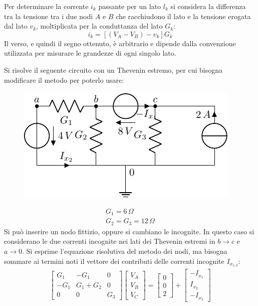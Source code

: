 \documentclass{article}
\numberwithin{equation}{subsection}
\begin{document}
Per determinare la corrente $i_k$ passante per un lato $l_k$ si considera la differenza tra la tensione tra i due nodi $A$ e $B$ che racchiudono il lato e la tensione erogata dal 
lato $v_k$, moltiplicata per la conduttanza del lato $G_k$:
\begin{equation*}
    i_k=[(V_A-V_B)-v_k]G_k
\end{equation*}
Il verso, e quindi il segno ottenuto, è arbitrario e dipende dalla convenzione utilizzata per misurare le grandezze di ogni singolo lato. 


Si risolve il seguente circuito con un Thevenin estremo, per cui bisogna modificare il metodo per poterlo usare:
\begin{figure}[H]%
    \centering
    \includegraphics{circuito-2.pdf}
    \label{fig:circuito-2}
\end{figure}
\begin{gather*}
    G_1=6\,\Omega\\
    G_2=G_3=12\,\Omega
\end{gather*}
Si può inserire un nodo fittizio, oppure si cambiano le incognite. In questo caso si considerano le due correnti incognite nei lati dei Thevenin estremi in $b\to c$ e $a\to0$. 
Si esprime l'equazione risolutiva del metodo dei nodi, ma bisogna sommare ai termini noti il vettore dei contributi delle correnti incognite $I_{x_{1,2}}$: 
\begin{gather*}
    \begin{bmatrix}
        G_1&-G_1&0\\-G_1&G_1+G_2&0\\0&0&G_3
    \end{bmatrix}\begin{bmatrix}
        V_A\\V_B\\V_C
    \end{bmatrix}=\begin{bmatrix}
        0\\0\\2
    \end{bmatrix}+\begin{bmatrix}
        -I_{x_1}\\I_{x_2}\\-I_{x_2}
    \end{bmatrix}
\end{gather*}
\end{document}
